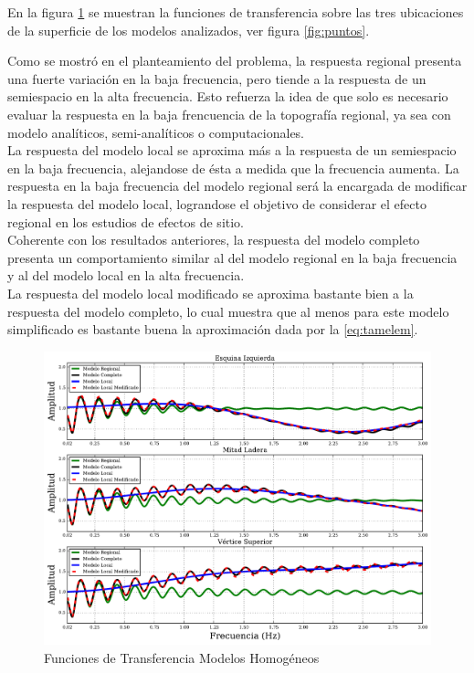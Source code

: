 \documentclass[spanish,letterpaper,12pt,twoside,openany]{article}
\begin{document}
En la figura \ref{fig:tfhom} se muestran la funciones de transferencia sobre las tres ubicaciones de la superficie de los modelos analizados, ver figura \ref{fig:puntos}. 

Como se mostró en el planteamiento del problema, la respuesta regional presenta una fuerte variación en la baja frecuencia, pero tiende a la respuesta de un semiespacio en la alta frecuencia. Esto refuerza la idea de que solo es necesario evaluar la respuesta en la baja frencuencia de la topografía regional, ya sea con modelo analíticos, semi-analíticos o computacionales.\\
%
La respuesta del modelo local se aproxima más a la respuesta de un semiespacio en la baja frecuencia, alejandose de ésta a medida que la frecuencia aumenta. La respuesta en la baja frecuencia del modelo regional será la encargada de modificar la respuesta del modelo local, lograndose el objetivo de considerar el efecto regional en los estudios de efectos de sitio.\\
%
Coherente con los resultados anteriores, la respuesta del modelo completo presenta un comportamiento similar al del modelo regional en la baja frecuencia y al del modelo local en la alta frecuencia.\\
%
La respuesta del modelo local modificado se aproxima bastante bien a la respuesta del modelo completo, lo cual muestra que al menos para este modelo simplificado es bastante buena la aproximación dada por la \cref{eq:tamelem}.

\begin{figure}[H]
	\centering
	\includegraphics[width=15 cm]{img/TransFuncHom.pdf}
	\vspace{-.5 cm}
	\caption{Funciones de Transferencia Modelos Homogéneos}
	\label{fig:tfhom}
	\vspace{-1 cm}
\end{figure}
%
%
%
%
%
\end{document}
